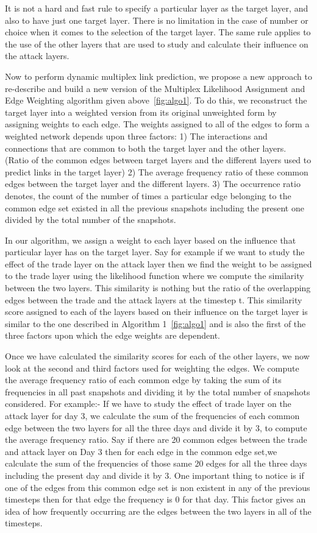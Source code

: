 It is not a hard and fast rule to specify a particular layer as the target
layer, and also to have just one target layer. There is no limitation in the
case of number or choice when it comes to the selection of the target layer.
The same rule applies to the use of the other layers that are used to study
and calculate their influence on the attack layers.

Now to perform dynamic multiplex link prediction, we propose a new approach to
re-describe and build a new version of the Multiplex Likelihood Assignment and
Edge Weighting algorithm given above~\ref{fig:algo1}. To do this, we
reconstruct the target layer into a weighted version from its original
unweighted form by assigning weights to each edge. The weights assigned to all
of the edges to form a weighted network depends upon three factors: 1) The
interactions and connections that are common to both the target layer and the
other layers. (Ratio of the common edges between target layers and the
different layers used to predict links in the target layer) 2) The average
frequency ratio of these common edges between the target layer and the
different layers. 3) The occurrence ratio denotes, the count of the number of
times a particular edge belonging to the common edge set existed in all the
previous snapshots including the present one divided by the total number of
the snapshots. 

In our algorithm, we assign a weight to each layer based on the influence that
particular layer has on the target layer. Say for example if we want to study
the effect of the trade layer on the attack layer then we find the weight to
be assigned to the trade layer using the likelihood function where we compute
the similarity between the two layers. This similarity is nothing but the
ratio of the overlapping edges between the trade and the attack layers at the
timestep t. This similarity score assigned to each of the layers based on
their influence on the target layer is similar to the one described in
Algorithm 1~\ref{fig:algo1} and is also the first of the three factors upon
which the edge weights are dependent.

Once we have calculated the similarity scores for each of the other layers, we
now look at the second and third factors used for weighting the edges. We
compute the average frequency ratio of each common edge by taking the sum of
its frequencies in all past snapshots and dividing it by the total number of
snapshots considered. For example:- If we have to study the effect of trade
layer on the attack layer for day 3, we calculate the sum of the frequencies
of each common edge between the two layers for all the three days and divide
it by 3, to compute the average frequency ratio. Say if there are 20 common
edges between the trade and attack layer on Day 3 then for each edge in the
common edge set,we calculate the sum of the frequencies of those same 20 edges
for all the three days including the present day and divide it by 3. One
important thing to notice is if one of the edges from this common edge set is
non existent in any of the previous timesteps then for that edge the
frequency is 0 for that day. This factor gives an idea of how frequently
occurring are the edges between the two layers in all of the timesteps.

